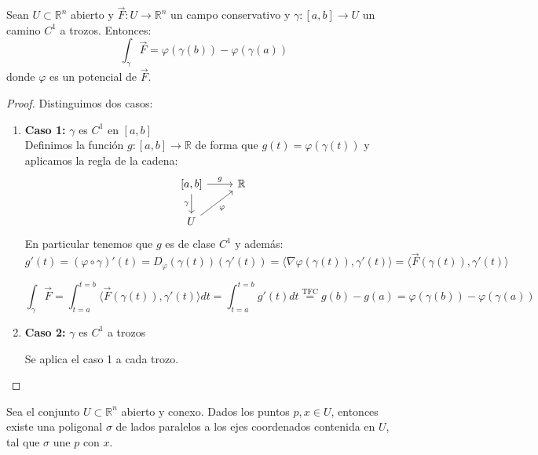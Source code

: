 \begin{proposición}
Sean $U \subset \mathbb{R}^n$ abierto y $\vec{F}: U \to \mathbb{R}^n$ un campo conservativo y $\gamma: [a,b] \to U$ un camino $C^1$ a trozos. Entonces:
$$\int_{\gamma} \vec{F} = \varphi(\gamma(b)) - \varphi(\gamma(a))$$
donde $\varphi$ es un potencial de $\vec{F}$.
\end{proposición}

\begin{proof}
    Distinguimos dos casos:
    \begin{enumerate}
        \item \textbf{Caso 1:} $\gamma$ es $C^1$ en $[a,b]$\\
              Definimos la función $g: [a,b] \to \mathbb{R}$ de forma que $g(t) = \varphi(\gamma(t))$ y aplicamos la regla de la cadena:
              \[
                  \begin{tikzcd}
                      {[a,b]} \arrow[d, "\gamma"'] \arrow[r, "g"] & \mathbb{R} \\
                      U \arrow[ru, "\varphi"']
                  \end{tikzcd}
              \]
              En particular tenemos que $g$ es de clase $C^1$ y además:
              \[
                  g'(t) = (\varphi \circ \gamma)'(t) = D_\varphi (\gamma(t)) (\gamma'(t)) = \langle \nabla \varphi (\gamma(t)), \gamma'(t) \rangle = \langle \vec{F}(\gamma(t)), \gamma'(t) \rangle
              \]

              \[
                  \int_{\gamma} \vec{F} = \int_{t=a}^{t=b} \langle \vec{F} (\gamma(t)), \gamma'(t) \rangle dt = \int_{t=a}^{t=b} g'(t) dt \overset{\text{TFC}}{=} g(b) - g(a) = \varphi (\gamma(b)) - \varphi (\gamma(a))
              \]

        \item \textbf{Caso 2:} \(\gamma\) es \(C^1\) a trozos

              Se aplica el caso 1 a cada trozo.
    \end{enumerate}
\end{proof}

\begin{lema}
    Sea el conjunto \( U \subset \mathbb{R}^n \) abierto y conexo. Dados los puntos \( p, x \in U \), entonces existe una poligonal \( \sigma \) de lados paralelos a los ejes coordenados contenida en \( U \), tal que \( \sigma \) une \( p \) con \( x \).
    \label{lema:poligonal}
\end{lema}

